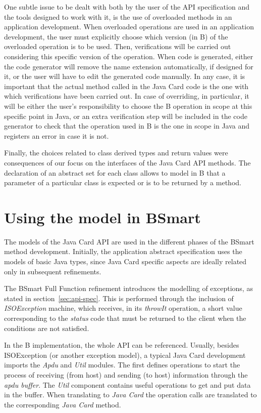 \documentclass{llncs}
\begin{document}
One subtle issue to be dealt with both by the user of the API
specification and the tools designed to work with it, is the use of
overloaded methods in an application development. When overloaded
operations are used in an application development, the user must
explicitly choose which version (in B) of the overloaded operation is to be
used. Then, verifications will be carried out considering this
specific version of the operation. When code is generated, either the
code generator will remove the name extension automatically, if
designed for it, or the user will have to edit the generated code
manually. In any case, it is important that the actual method called
in the Java Card code is the one with which verifications have been
carried out.  In case of overriding, in particular, it will be either
the user's responsibility to choose the B operation in scope at
this specific point in Java, or an extra verification step will be
included in the code generator to check that the operation used in
B is the one in scope in Java and registers an error in case it is
not.

Finally, the choices related to class derived types and return values
were consequences of our focus on the interfaces of the Java Card API
methods. The declaration of an abstract set for each class allows to
model in B that a parameter of a particular class is expected or is to
be returned by a method.

\section{Using the model in BSmart}\label{sec:using-the-API}

The models of the Java Card API are used in the different phases of the 
BSmart method development. Initially, the application 
abstract specification uses the models of basic Java types, 
since Java Card specific aspects are ideally related only
in subsequent refinements.

The BSmart Full Function refinement introduces the modelling of exceptions, 
as stated in section~\ref{sec:api-spec}. This is performed through  the inclusion
of \emph{ISOException} machine, which receives, in its \emph{throwIt} operation, 
a short value corresponding to the \emph{status} code that must be returned to 
the client when the conditions are not satisfied.  

In the B implementation, the whole API can be referenced. Usually,
besides ISOException (or another exception model), a typical Java Card
development imports the \emph{Apdu} and \emph{Util} modules. The first
defines operations to start the process of receiving (from host) and
sending (to host) information through the \emph{apdu buffer}.  
The \emph{Util} component contains useful
operations to get and put data in the buffer. When
translating to \emph{Java Card} the operation calls are translated
to the corresponding \emph{Java Card} method.
\end{document}
